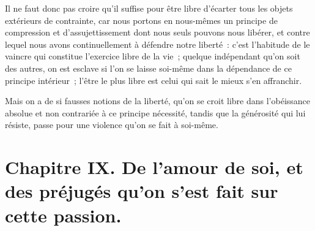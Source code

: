 \documentclass[french,twoside]{book} %
\newcommand\chapteropen{} %
\newcommand\chapterclose{} %
\begin{document}
Il ne faut donc pas croire qu’il suffise pour être libre d’écarter tous les objets extérieurs de contrainte, car nous portons en nous-mêmes un principe de compression et d’assujettissement dont nous seuls pouvons nous libérer, et contre lequel nous avons continuellement à défendre notre liberté : c’est l’habitude de le vaincre qui constitue l’exercice libre de la vie ; quelque indépendant qu’on soit des autres, on est esclave si l’on se laisse soi-même dans la dépendance de ce principe intérieur ; l’être le plus libre est celui qui sait le mieux s’en affranchir.\par
Mais on a de si fausses notions de la liberté, qu’on se croit libre dans l’obéissance absolue et non contrariée à ce principe nécessité, tandis que la générosité qui lui résiste, passe pour une violence qu’on se fait à soi-même.
\chapterclose


\chapteropen
\chapter[{Chapitre IX. De l’amour de soi, et des préjugés qu’on s’est fait sur cette passion.}]{Chapitre IX. De l’amour de soi, et des préjugés qu’on s’est fait sur cette passion.}\renewcommand{\leftmark}{Chapitre IX. De l’amour de soi, et des préjugés qu’on s’est fait sur cette passion.}
\end{document}
